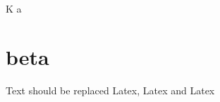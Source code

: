 \def\replace#1#2#3{
	\def\tmp##1#2{##1#3\tmp}
	\tmp#1\stopreplace#2\stopreplace}
\def\stopreplace#1\stopreplace{}

K
\newpage
{}
a
\newpage
\section{beta}

\replace{Text should be replaced here, here and here}{here}{Latex}
\replace{Pablo|P}{|}{\\}